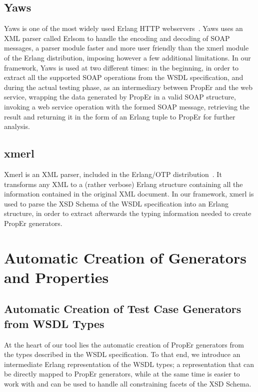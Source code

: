 \documentclass[submission,copyright]{eptcs}
\begin{document}
\subsection{Yaws}

Yaws is one of the most widely used Erlang HTTP webservers~\cite{yaws}.
Yaws uses an XML parser called Erlsom to handle the encoding and decoding
of SOAP messages, a parser module faster and more user friendly than
the xmerl module of the Erlang distribution, imposing however a few
additional limitations. In our framework, Yaws is used at two
different times: in the beginning, in order to extract all the
supported SOAP operations from the WSDL specification, and during the
actual testing phase, as an intermediary between PropEr and the web
service, wrapping the data generated by PropEr in a valid SOAP
structure, invoking a web service operation with the formed SOAP
message, retrieving the result and returning it in the form of an
Erlang tuple to PropEr for further analysis.

\subsection{xmerl}

Xmerl is an XML parser, included in the Erlang/OTP distribution~\cite{xmerl}.
It transforms any XML to a (rather verbose) Erlang structure containing all the 
information contained in the original XML document. In our framework, xmerl is 
used to parse the XSD Schema of the WSDL specification into an Erlang structure, in 
order to extract afterwards the typing information needed to create PropEr generators.

\section{Automatic Creation of Generators and Properties} \label{sec:automatic}

\subsection{Automatic Creation of Test Case Generators from WSDL Types}

At the heart of our tool lies the automatic creation of PropEr generators from 
the types described in the WSDL specification. To that end, we introduce an 
intermediate Erlang representation of the WSDL types; a representation that can 
be directly mapped to PropEr generators, while at the same time is
easier to work with and can be used to handle all constraining facets
of the XSD Schema.
\end{document}
